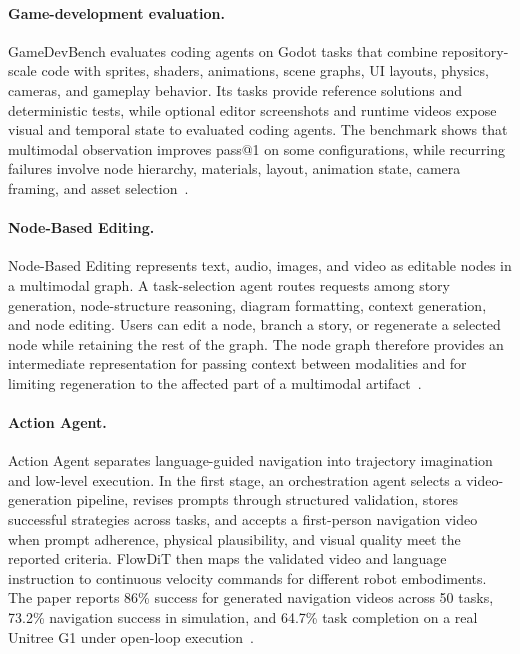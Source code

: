 \paragraph{Game-development evaluation.}
GameDevBench evaluates coding agents on Godot tasks that combine repository-scale code with sprites, shaders, animations, scene graphs, UI layouts, physics, cameras, and gameplay behavior. Its tasks provide reference solutions and deterministic tests, while optional editor screenshots and runtime videos expose visual and temporal state to evaluated coding agents. The benchmark shows that multimodal observation improves pass@1 on some configurations, while recurring failures involve node hierarchy, materials, layout, animation state, camera framing, and asset selection~\cite{avg260211103}.

\paragraph{Node-Based Editing.}
Node-Based Editing represents text, audio, images, and video as editable nodes in a multimodal graph. A task-selection agent routes requests among story generation, node-structure reasoning, diagram formatting, context generation, and node editing. Users can edit a node, branch a story, or regenerate a selected node while retaining the rest of the graph. The node graph therefore provides an intermediate representation for passing context between modalities and for limiting regeneration to the affected part of a multimodal artifact~\cite{avg251103227}.

\paragraph{Action Agent.}
Action Agent separates language-guided navigation into trajectory imagination and low-level execution. In the first stage, an orchestration agent selects a video-generation pipeline, revises prompts through structured validation, stores successful strategies across tasks, and accepts a first-person navigation video when prompt adherence, physical plausibility, and visual quality meet the reported criteria. FlowDiT then maps the validated video and language instruction to continuous velocity commands for different robot embodiments. The paper reports 86\% success for generated navigation videos across 50 tasks, 73.2\% navigation success in simulation, and 64.7\% task completion on a real Unitree G1 under open-loop execution~\cite{avg260501477}.

